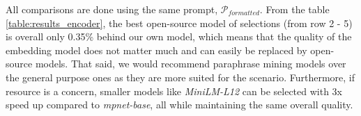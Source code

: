 All comparisons are done using the same prompt, $\mathcal{P}_{formatted}$. From the table \ref{table:results_encoder}, the best open-source model of selections (from row 2 - 5) is overall only 0.35\% behind our own model, which means that the quality of the embedding model does not matter much and can easily be replaced by open-source models. That said, we would recommend paraphrase mining models over the general purpose ones as they are more suited for the scenario. Furthermore, if resource is a concern, smaller models like \textit{MiniLM-L12} can be selected with 3x speed up compared to \textit{mpnet-base}, all while maintaining the same overall quality.
